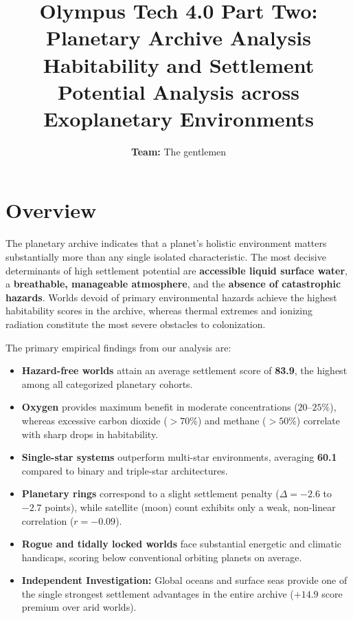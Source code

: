\documentclass[11pt,a4paper]{article}
\title{\textbf{Olympus Tech 4.0 Part Two: Planetary Archive Analysis}\\[0.5em]
\large Habitability and Settlement Potential Analysis across Exoplanetary Environments}
\author{\textbf{Team:} The gentlemen}
\date{}
\begin{document}
\maketitle


\section*{Overview}

The planetary archive indicates that a planet's holistic environment matters substantially more than any single isolated characteristic. The most decisive determinants of high settlement potential are \textbf{accessible liquid surface water}, a \textbf{breathable, manageable atmosphere}, and the \textbf{absence of catastrophic hazards}. Worlds devoid of primary environmental hazards achieve the highest habitability scores in the archive, whereas thermal extremes and ionizing radiation constitute the most severe obstacles to colonization.

The primary empirical findings from our analysis are:
\begin{itemize}[noitemsep]
    \item \textbf{Hazard-free worlds} attain an average settlement score of \textbf{83.9}, the highest among all categorized planetary cohorts.
    \item \textbf{Oxygen} provides maximum benefit in moderate concentrations ($20$--$25\%$), whereas excessive carbon dioxide ($>70\%$) and methane ($>50\%$) correlate with sharp drops in habitability.
    \item \textbf{Single-star systems} outperform multi-star environments, averaging \textbf{60.1} compared to binary and triple-star architectures.
    \item \textbf{Planetary rings} correspond to a slight settlement penalty ($\Delta = -2.6$ to $-2.7$ points), while satellite (moon) count exhibits only a weak, non-linear correlation ($r = -0.09$).
    \item \textbf{Rogue and tidally locked worlds} face substantial energetic and climatic handicaps, scoring below conventional orbiting planets on average.
    \item \textbf{Independent Investigation:} Global oceans and surface seas provide one of the single strongest settlement advantages in the entire archive ($+14.9$ score premium over arid worlds).
\end{itemize}


\vspace{1em}
\end{document}
